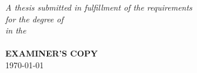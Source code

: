 \documentclass[
11pt, %
english, %
onehalfspacing, %
liststotoc, %
headsepline, %
]{MastersDoctoralThesis} %
\begin{document}
\begin{titlepage}
\begin{center}
\large \textit{A thesis submitted in fulfillment of the requirements\\ for the degree of \degreename}\\[0.3cm] %
\textit{in the}\\[0.4cm]
\deptname\\[1cm] %
 
 \LARGE\textbf{EXAMINER'S COPY}\\
{\large \today}%

\vfill
\end{center}
\end{titlepage}

\end{document}
